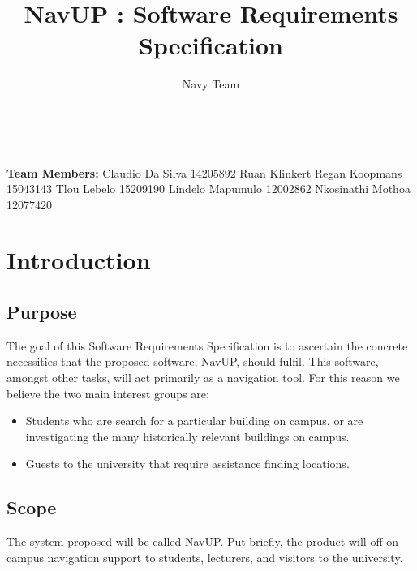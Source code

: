 \documentclass[12pt,a4paper]{article}
\author{Navy Team}
\title{NavUP : Software Requirements Specification}
\begin{document}
	\maketitle\
	
	\begin{flushright}
	 \textbf{Team Members: }\newline
	 Claudio Da Silva 14205892\newline
	 Ruan Klinkert \newline
	 Regan Koopmans 15043143\newline
	 Tlou Lebelo 15209190\newline
	 Lindelo Mapumulo 12002862\newline
	 Nkosinathi Mothoa 12077420\newline
    \end{flushright}

	\section{Introduction}

		\subsection{Purpose}

		The goal of this Software Requirements Specification is to ascertain the
		concrete necessities that the proposed software, NavUP, should fulfil. This
		software, amongst other tasks, will act primarily as a navigation tool. For
		this reason we believe the two main interest groups are:

		\begin{itemize}
			\item Students who are search for a particular building on campus, or are
						investigating the many historically relevant buildings on campus.

			\item Guests to the university that require assistance finding locations.
		\end{itemize}


		\subsection{Scope}

			The system proposed will be called NavUP. Put briefly, the product will
			off on-campus navigation support to students, lecturers, and visitors to
			the university.
\end{document}
